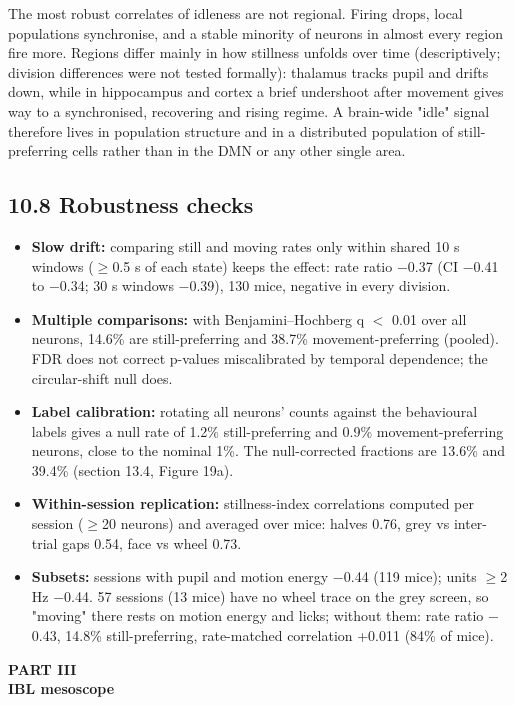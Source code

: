 \documentclass[10pt,a4paper]{article}
\begin{document}
The most robust correlates of idleness are not regional. Firing drops, local populations synchronise, and a stable minority of neurons in almost every region fire more. Regions differ mainly in how stillness unfolds over time (descriptively; division differences were not tested formally): thalamus tracks pupil and drifts down, while in hippocampus and cortex a brief undershoot after movement gives way to a synchronised, recovering and rising regime. A brain-wide "idle" signal therefore lives in population structure and in a distributed population of still-preferring cells rather than in the DMN or any other single area.

\subsection{10.8 Robustness checks}
\begin{itemize}
\item \textbf{Slow drift:} comparing still and moving rates only within shared 10 s windows ($\geq$0.5 s of each state) keeps the effect: rate ratio $-$0.37 (CI $-$0.41 to $-$0.34; 30 s windows $-$0.39), 130 mice, negative in every division.
\item \textbf{Multiple comparisons:} with Benjamini--Hochberg q $<$ 0.01 over all neurons, 14.6\% are still-preferring and 38.7\% movement-preferring (pooled). FDR does not correct p-values miscalibrated by temporal dependence; the circular-shift null does.
\item \textbf{Label calibration:} rotating all neurons' counts against the behavioural labels gives a null rate of 1.2\% still-preferring and 0.9\% movement-preferring neurons, close to the nominal 1\%. The null-corrected fractions are 13.6\% and 39.4\% (section 13.4, Figure 19a).
\item \textbf{Within-session replication:} stillness-index correlations computed per session ($\geq$20 neurons) and averaged over mice: halves 0.76, grey vs inter-trial gaps 0.54, face vs wheel 0.73.
\item \textbf{Subsets:} sessions with pupil and motion energy $-$0.44 (119 mice); units $\geq$2 Hz $-$0.44. 57 sessions (13 mice) have no wheel trace on the grey screen, so "moving" there rests on motion energy and licks; without them: rate ratio $-$0.43, 14.8\% still-preferring, rate-matched correlation +0.011 (84\% of mice).
\end{itemize}
\clearpage
{\small\bfseries\color{accent} PART III}\\[2pt]
{\LARGE\bfseries IBL mesoscope}\par\medskip
\end{document}
